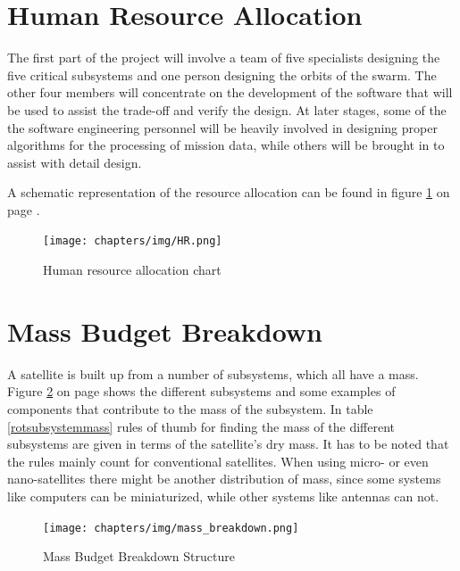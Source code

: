 \section{Human Resource Allocation}
\label{DDHR}
The first part of the project will involve a team of five specialists designing the five critical subsystems and one person designing the orbits of the swarm. The other four members will concentrate on the development of the software that will be used to assist the trade-off and verify the design. At later stages, some of the the software engineering personnel will be heavily involved in designing proper algorithms for the processing of mission data, while others will be brought in to assist with detail design. 

A schematic representation of the resource allocation can be found in figure \ref{fig:DDBBHR} on page \pageref{fig:DDBBHR}.

\begin{figure}[ht!]
\begin{center}
\texttt{[image: chapters/img/HR.png]}
\label{fig:DDBBHR}
\caption{Human resource allocation chart}
\end{center}
\end{figure}


\section{Mass Budget Breakdown}
\label{sect_mass_budget}
A satellite is built up from a number of subsystems, which all have a mass. Figure \ref{massbreakdown} on page \pageref{massbreakdown} shows the different subsystems and some examples of components that contribute to the mass of the subsystem. In table \ref{rotsubsystemmass} rules of thumb for finding the mass of the different subsystems are given in terms of the satellite's dry mass. It has to be noted that the rules mainly count for conventional satellites. When using micro- or even nano-satellites there might be another distribution of mass, since some systems like computers can be miniaturized, while other systems like antennas can not. 

\begin{figure} [ht]
\centering
\texttt{[image: chapters/img/mass\_breakdown.png]}
\label{massbreakdown}
\caption{Mass Budget Breakdown Structure}
\end{figure}

